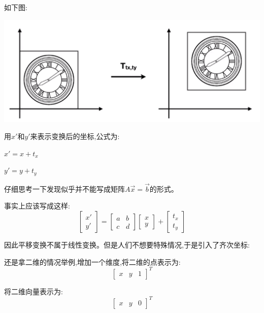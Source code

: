 \documentclass[UTF8]{ctexbook}
\begin{document}
{{{{        如下图:

        \includegraphics[scale=0.25]{resources/homogeneous_coordinates.png}

        用$x\prime$和$y\prime$来表示变换后的坐标,公式为:

        $x\prime = x + t_x$

        $y\prime = y + t_y$

        仔细思考一下发现似乎并不能写成矩阵$A\vec{x} = \vec{b}$的形式。

        事实上应该写成这样:
        $$
          \left[\begin{array}{c}
              x\prime \\
              y\prime
            \end{array}\right]
          =
          \left[\begin{matrix}
              a & b \\
              c & d
            \end{matrix}\right]
          \left[\begin{array}{c}
              x \\
              y
            \end{array}\right]
          +
          \left[\begin{array}{c}
              t_x \\
              t_y
            \end{array}\right]
        $$

        因此平移变换不属于线性变换。但是人们不想要特殊情况,于是引入了齐次坐标:

        还是拿二维的情况举例,增加一个维度,将二维的点表示为:
        $$\left[\begin{array}{ccc}
              x & y & 1
            \end{array}\right]^T$$

        将二维向量表示为:
        $$\left[\begin{array}{ccc}
              x & y & 0
            \end{array}\right]^T$$

}}}}
\end{document}
